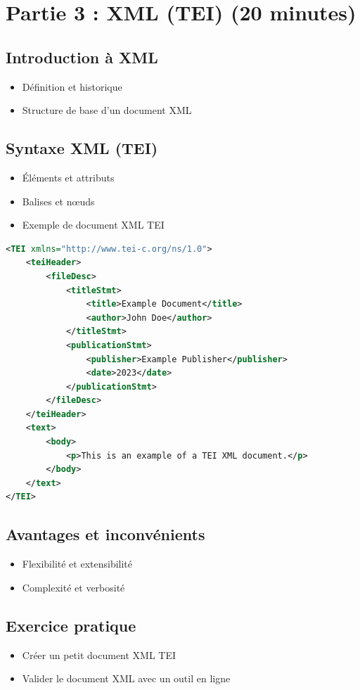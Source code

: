 \documentclass{article}
\begin{document}
\section{Partie 3 : XML (TEI) (20 minutes)}
\subsection{Introduction à XML}
\begin{itemize}
    \item Définition et historique
    \item Structure de base d'un document XML
\end{itemize}

\subsection{Syntaxe XML (TEI)}
\begin{itemize}
    \item Éléments et attributs
    \item Balises et nœuds
    \item Exemple de document XML TEI
\end{itemize}

\begin{lstlisting}[language=XML, caption=Exemple de document XML TEI]
<TEI xmlns="http://www.tei-c.org/ns/1.0">
    <teiHeader>
        <fileDesc>
            <titleStmt>
                <title>Example Document</title>
                <author>John Doe</author>
            </titleStmt>
            <publicationStmt>
                <publisher>Example Publisher</publisher>
                <date>2023</date>
            </publicationStmt>
        </fileDesc>
    </teiHeader>
    <text>
        <body>
            <p>This is an example of a TEI XML document.</p>
        </body>
    </text>
</TEI>
\end{lstlisting}

\subsection{Avantages et inconvénients}
\begin{itemize}
    \item Flexibilité et extensibilité
    \item Complexité et verbosité
\end{itemize}

\subsection{Exercice pratique}
\begin{itemize}
    \item Créer un petit document XML TEI
    \item Valider le document XML avec un outil en ligne
\end{itemize}
\end{document}
